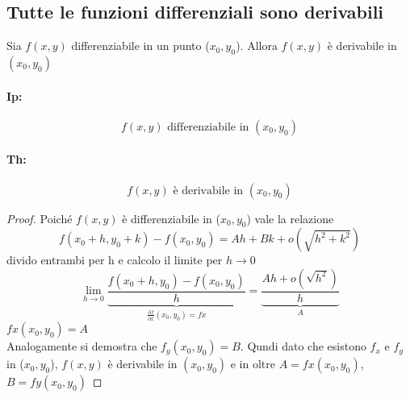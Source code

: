 \subsection{Tutte le funzioni differenziali sono derivabili}
Sia $f(x,y)$ differenziabile in un punto ($x_0,y_0$). Allora $f(x,y)$ è derivabile in
$(x_0,y_0)$
\begin{multicols}{2}
  \paragraph{Ip:}
  \begin{equation*}
    f(x,y) \text{ differenziabile in } (x_0,y_0)
  \end{equation*}
  \paragraph{Th:}
  \begin{equation*}
    f(x,y) \text{ è derivabile in } (x_0,y_0)
  \end{equation*}
\end{multicols}
\begin{proof}
  Poiché $f(x,y)$ è differenziabile in ($x_0,y_0$) vale la relazione
  \begin{equation*}
    f(x_0+h,y_0+k) - f(x_0,y_0)=Ah+Bk+o(\sqrt{h^2+k^2})
  \end{equation*}
  divido entrambi per h e calcolo il limite per $h\to 0$
  \begin{equation*}
    \lim\limits_{h \to 0}\underbrace{\frac{f(x_0+h,y_0) - f(x_0,y_0)}{h}}_{\frac{\partial f}{\partial x}(x_0,y_0)=fx}=\underbrace{\frac{Ah+o(\sqrt{h^2})}{h}}_A
  \end{equation*}
  $fx(x_0,y_0)=A$\\
  Analogamente si demostra che $f_y(x_0,y_0)=B$. Qundi dato che esistono $f_x$ e $f_y$ in ($x_0,y_0$), $f(x,y)$ è derivabile in $(x_0,y_0)$ e in oltre $A=fx(x_0,y_0)$, $B=fy(x_0,y_0)$
\end{proof}
